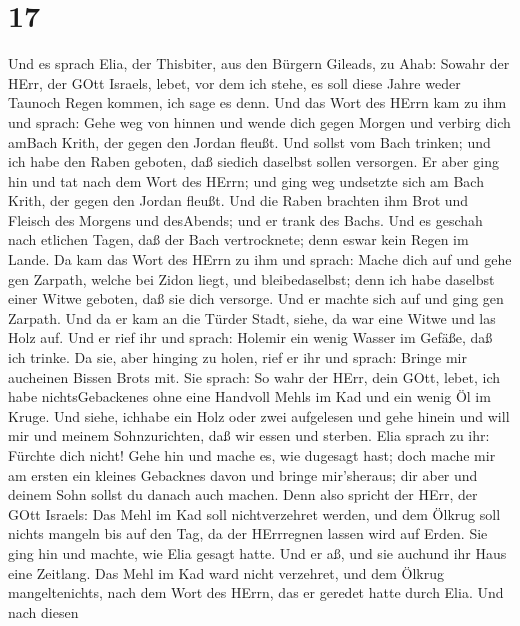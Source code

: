 \hypertarget{section-16}{%
\section{17}\label{section-16}}

 Und es sprach Elia, der Thisbiter, aus den Bürgern Gileads,
zu Ahab: Sowahr der HErr, der GOtt Israels, lebet, vor dem ich stehe, es
soll diese Jahre weder Taunoch Regen kommen, ich sage es denn.
 Und das Wort des HErrn kam zu ihm und sprach: 
Gehe weg von hinnen und wende dich gegen Morgen und verbirg dich amBach
Krith, der gegen den Jordan fleußt.  Und sollst vom Bach
trinken; und ich habe den Raben geboten, daß siedich daselbst sollen
versorgen.  Er aber ging hin und tat nach dem Wort des
HErrn; und ging weg undsetzte sich am Bach Krith, der gegen den Jordan
fleußt.  Und die Raben brachten ihm Brot und Fleisch des
Morgens und desAbends; und er trank des Bachs.  Und es
geschah nach etlichen Tagen, daß der Bach vertrocknete; denn eswar kein
Regen im Lande.  Da kam das Wort des HErrn zu ihm und
sprach:  Mache dich auf und gehe gen Zarpath, welche bei
Zidon liegt, und bleibedaselbst; denn ich habe daselbst einer Witwe
geboten, daß sie dich versorge.  Und er machte sich auf und
ging gen Zarpath. Und da er kam an die Türder Stadt, siehe, da war eine
Witwe und las Holz auf. Und er rief ihr und sprach: Holemir ein wenig
Wasser im Gefäße, daß ich trinke.  Da sie, aber hinging zu
holen, rief er ihr und sprach: Bringe mir aucheinen Bissen Brots mit.
 Sie sprach: So wahr der HErr, dein GOtt, lebet, ich habe
nichtsGebackenes ohne eine Handvoll Mehls im Kad und ein wenig Öl im
Kruge. Und siehe, ichhabe ein Holz oder zwei aufgelesen und gehe hinein
und will mir und meinem Sohnzurichten, daß wir essen und sterben.
 Elia sprach zu ihr: Fürchte dich nicht! Gehe hin und mache
es, wie dugesagt hast; doch mache mir am ersten ein kleines Gebacknes
davon und bringe mir'sheraus; dir aber und deinem Sohn sollst du danach
auch machen.  Denn also spricht der HErr, der GOtt Israels:
Das Mehl im Kad soll nichtverzehret werden, und dem Ölkrug soll nichts
mangeln bis auf den Tag, da der HErrregnen lassen wird auf Erden.
 Sie ging hin und machte, wie Elia gesagt hatte. Und er aß,
und sie auchund ihr Haus eine Zeitlang.  Das Mehl im Kad
ward nicht verzehret, und dem Ölkrug mangeltenichts, nach dem Wort des
HErrn, das er geredet hatte durch Elia.  Und nach diesen
